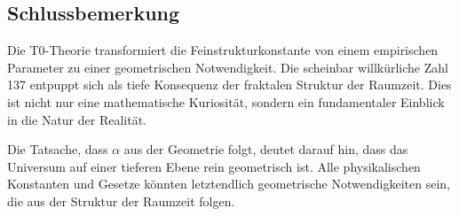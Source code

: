 \documentclass[12pt,a4paper]{article}
\theoremstyle{definition}
\begin{document}
	\subsection{Schlussbemerkung}
	
	Die T0-Theorie transformiert die Feinstrukturkonstante von einem empirischen Parameter zu einer geometrischen Notwendigkeit. Die scheinbar willkürliche Zahl 137 entpuppt sich als tiefe Konsequenz der fraktalen Struktur der Raumzeit. Dies ist nicht nur eine mathematische Kuriosität, sondern ein fundamentaler Einblick in die Natur der Realität.
	
	Die Tatsache, dass $\alpha$ aus der Geometrie folgt, deutet darauf hin, dass das Universum auf einer tieferen Ebene rein geometrisch ist. Alle physikalischen Konstanten und Gesetze könnten letztendlich geometrische Notwendigkeiten sein, die aus der Struktur der Raumzeit folgen.
	
\end{document}
